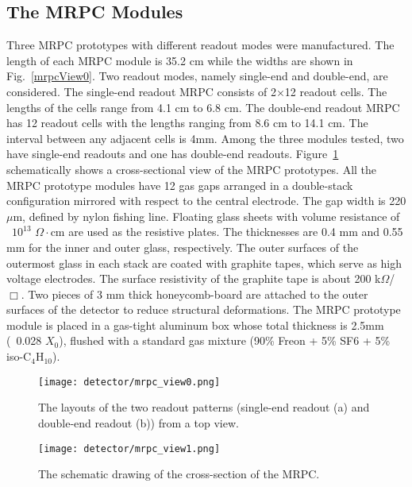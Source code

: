 \subsection{The MRPC Modules}
Three MRPC prototypes with different readout modes were manufactured. The length of each MRPC module is 35.2 cm while the widths are shown in Fig.~\ref{mrpcView0}. Two readout modes, namely single-end and double-end, are considered. The single-end readout MRPC consists of 2$\times$12 readout cells. The lengths of the cells range from 4.1 cm to 6.8 cm. The double-end readout MRPC has 12 readout cells with the lengths ranging from 8.6 cm to 14.1 cm. The interval between any adjacent cells is 4mm. Among the three modules tested, two have single-end readouts and one has double-end readouts. Figure~\ref{mrpcView1} schematically shows a cross-sectional view of the MRPC prototypes. All the MRPC prototype modules have 12 gas gaps arranged in a double-stack configuration mirrored with respect to the central electrode. The gap width is 220 $\mu$m, defined by nylon fishing line. Floating glass sheets with volume resistance of ~$10^{13}$ $\Omega\cdot$cm are used as the resistive plates. The thicknesses are 0.4 mm and 0.55 mm for the inner and outer glass, respectively. The outer surfaces of the outermost glass in each stack are coated with graphite tapes, which serve as high voltage electrodes. The surface resistivity of the graphite tape is about 200 k$\Omega$/$\Box$. Two pieces of 3 mm thick honeycomb-board are attached to the outer surfaces of the detector to reduce structural deformations. The MRPC prototype module is placed in a gas-tight aluminum box whose total thickness is 2.5mm (~0.028 $X_{0}$), flushed with a standard gas mixture (90\% Freon + 5\% SF6 + 5\% iso-C$_{4}$H$_{10}$).

\begin{figure}[htbp]
\begin{minipage}[htbp]{0.43\linewidth}
\centering
\texttt{[image: detector/mrpc\_view0.png]}
\caption{The layouts of the two readout patterns (single-end readout (a) and double-end readout (b)) from a top view. \label{mrpcView0}}
\end{minipage}
\hfill
\begin{minipage}[htbp]{0.55\linewidth}
\centering
\texttt{[image: detector/mrpc\_view1.png]} 
\caption{The schematic drawing of the cross-section of the MRPC.\label{mrpcView1}}
\end{minipage}
\end{figure}

